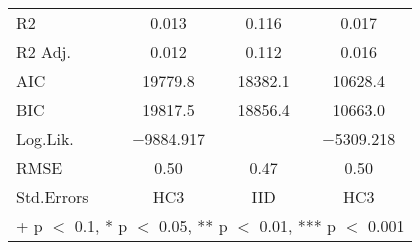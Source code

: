 \documentclass[
]{article}
\begin{document}
\begin{table}
\begin{tabular}[t]{lccc}
R2 & \num{0.013} & \num{0.116} & \num{0.017}\\
R2 Adj. & \num{0.012} & \num{0.112} & \num{0.016}\\
AIC & \num{19779.8} & \num{18382.1} & \num{10628.4}\\
BIC & \num{19817.5} & \num{18856.4} & \num{10663.0}\\
Log.Lik. & \num{-9884.917} &  & \num{-5309.218}\\
RMSE & \num{0.50} & \num{0.47} & \num{0.50}\\
Std.Errors & HC3 & IID & HC3\\
\bottomrule
\multicolumn{4}{l}{\rule{0pt}{1em}+ p $<$ 0.1, * p $<$ 0.05, ** p $<$ 0.01, *** p $<$ 0.001}\\
\end{tabular}
\end{table}
\end{document}
